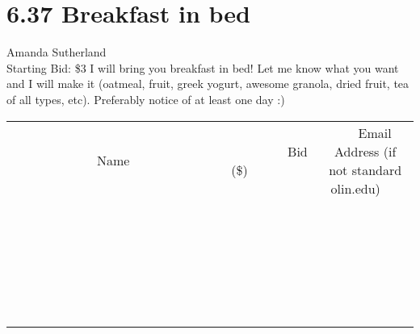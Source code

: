 \documentclass[11pt]{article}
\begin{document}
\section*{6.37 Breakfast in bed}
Amanda Sutherland
\\
Starting Bid: \$3
\newline
I will bring you breakfast in bed! Let me know what you want and I will make it (oatmeal, fruit, greek yogurt, awesome granola, dried fruit, tea of all types, etc). Preferably notice of at least one day :)
\\[6ex]
\begin{tabular}{c c c}
~~~~~~~~~~~~~Name~~~~~~~~~~~~~ & ~~~~~~~~~Bid (\$)~~~~~~~~~  & ~~~Email Address (if not standard olin.edu)~~~\\
 & & \\
\hline
 & & \\
\hline
 & & \\
\hline
 & & \\
\hline
 & & \\
\hline
 & & \\
\hline
 & & \\
\hline
 & & \\
\hline
 & & \\
\hline
 & & \\
\hline
 & & \\
\hline
 & & \\
\hline
 & & \\
\hline
 & & \\
\hline
 & & \\
\hline
 & & \\
\hline
 & & \\
\hline
 & & \\
\hline
 & & \\
\hline
 & & \\
\hline
 & & \\
\hline
 & & \\
\hline
 & & \\
\hline
 & & \\
\hline
 & & \\
\hline
 & & \\
\hline
\end{tabular}
\newpage
\end{document}
